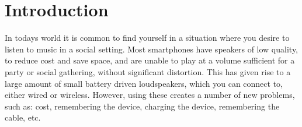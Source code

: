 \chapter{Introduction}\label{cha:introduction}
%
% 
%
%
%
%
%

In todays world it is common to find yourself in a situation where you desire to listen to music in a social setting.
Most smartphones have speakers of low quality, to reduce cost and save space, and are unable to play at a volume sufficient for a party or social gathering, without significant distortion.
This has given rise to a large amount of small battery driven loudspeakers, which you can connect to, either wired or wireless.
However, using these creates a number of new problems, such as: cost, remembering the device, charging the device, remembering the cable, etc.

